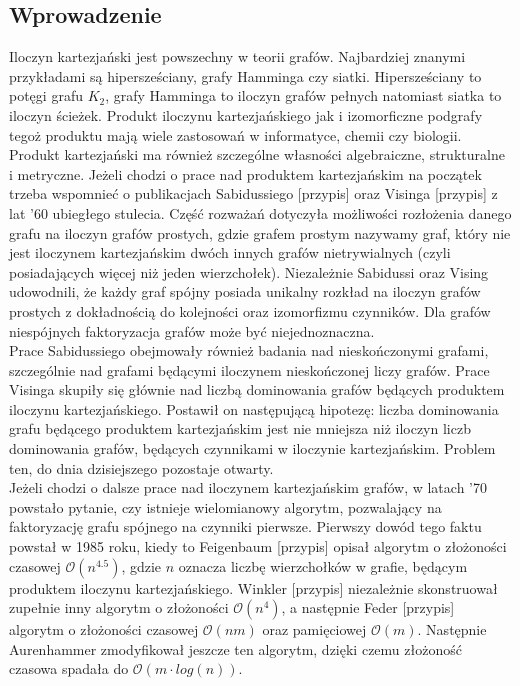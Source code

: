 \documentclass[12pt,a4paper,titlepage]{article}
\begin{document}
\subsection{Wprowadzenie}
Iloczyn kartezjański jest powszechny w teorii grafów. Najbardziej znanymi przykładami są hipersześciany, grafy Hamminga czy siatki. Hipersześciany to potęgi grafu $K_2$, grafy Hamminga to iloczyn grafów pełnych natomiast siatka to iloczyn ścieżek. Produkt iloczynu kartezjańskiego jak i izomorficzne podgrafy tegoż produktu mają wiele zastosowań w informatyce, chemii czy biologii.\\
Produkt kartezjański ma również szczególne własności algebraiczne, strukturalne i metryczne. Jeżeli chodzi o prace nad produktem kartezjańskim na początek trzeba wspomnieć o publikacjach Sabidussiego [przypis] oraz Visinga [przypis] z lat '60 ubiegłego stulecia. Część rozważań dotyczyła możliwości rozłożenia danego grafu na iloczyn grafów prostych, gdzie grafem prostym nazywamy graf, który nie jest iloczynem kartezjańskim dwóch innych grafów nietrywialnych (czyli posiadających więcej niż jeden wierzchołek). Niezależnie Sabidussi oraz Vising udowodnili, że każdy graf spójny posiada unikalny rozkład na iloczyn grafów prostych z dokładnością do kolejności oraz izomorfizmu czynników. Dla grafów niespójnych faktoryzacja grafów może być niejednoznaczna.\\
Prace Sabidussiego obejmowały również badania nad nieskończonymi grafami, szczególnie nad grafami będącymi iloczynem nieskończonej liczy grafów. Prace Visinga skupiły się głównie nad liczbą dominowania grafów będących produktem iloczynu kartezjańskiego. Postawił on następującą hipotezę: liczba dominowania grafu będącego produktem kartezjańskim jest nie mniejsza niż iloczyn liczb dominowania grafów, będących czynnikami w iloczynie kartezjańskim. Problem ten, do dnia dzisiejszego pozostaje otwarty. \\
Jeżeli chodzi o dalsze prace nad iloczynem kartezjańskim grafów, w latach '70 powstało pytanie, czy istnieje wielomianowy algorytm, pozwalający na faktoryzację grafu spójnego na czynniki pierwsze. Pierwszy dowód tego faktu powstał w 1985 roku, kiedy to Feigenbaum [przypis] opisał algorytm o złożoności czasowej $\mathcal{O} (n^{4.5})$, gdzie $n$ oznacza liczbę wierzchołków w grafie, będącym produktem iloczynu kartezjańskiego. Winkler [przypis] niezależnie skonstruował zupełnie inny algorytm o złożoności $\mathcal{O} (n^{4})$, a następnie Feder [przypis] algorytm o złożoności czasowej $\mathcal{O} (nm)$ oraz pamięciowej $\mathcal{O} (m)$. Następnie Aurenhammer zmodyfikował jeszcze ten algorytm, dzięki czemu złożoność czasowa spadała do $\mathcal{O} (m\cdot log (n))$.\\
\end{document}

